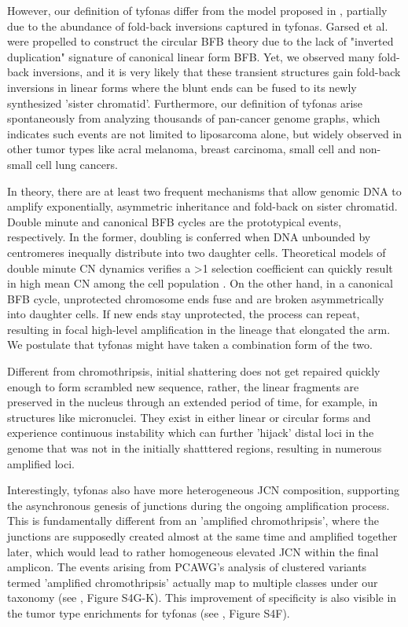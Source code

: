 \documentclass[phd,tocprelim]{cornell}
\begin{document}
However, our definition of tyfonas differ from the model proposed in \cite{garsed2014}, partially due to the abundance of fold-back inversions captured in tyfonas. Garsed et al. were propelled to construct the circular BFB theory due to the lack of "inverted duplication" signature of canonical linear form BFB. Yet, we observed many fold-back inversions, and it is very likely that these transient structures gain fold-back inversions in linear forms where the blunt ends can be fused to its newly synthesized 'sister chromatid'. Furthermore, our definition of tyfonas arise spontaneously from analyzing thousands of pan-cancer genome graphs, which indicates such events are not limited to liposarcoma alone, but widely observed in other tumor types like acral melanoma, breast carcinoma, small cell  and non-small cell lung cancers. 

In theory, there are at least two frequent mechanisms that allow genomic DNA to amplify exponentially, asymmetric inheritance and fold-back on sister chromatid. Double minute and canonical BFB cycles are the prototypical events, respectively. In the former, doubling is conferred when DNA unbounded by centromeres inequally distribute into two daughter cells. Theoretical models of double minute CN dynamics verifies a >1 selection coefficient can quickly result in high mean CN among the cell population \cite{Lange2021-if}. On the other hand, in a canonical BFB cycle, unprotected chromosome ends fuse and are broken asymmetrically into daughter cells. If new ends stay unprotected, the process can repeat, resulting in focal high-level amplification in the lineage that elongated the arm. We postulate that tyfonas might have taken a combination form of the two. 

Different from chromothripsis, initial shattering does not get repaired quickly enough to form scrambled new sequence, rather, the linear fragments are preserved in the nucleus through an extended period of time, for example, in structures like micronuclei. They exist in either linear or circular forms and experience continuous instability which can further 'hijack' distal loci in the genome that was not in the initially shatttered regions, resulting in numerous amplified loci.

Interestingly, tyfonas also have more heterogeneous JCN composition, supporting the asynchronous genesis of junctions during the ongoing amplification process. This is fundamentally different from an 'amplified chromothripsis', where the junctions are supposedly created almost at the same time and amplified together later, which would lead to rather homogeneous elevated JCN within the final amplicon. The events arising from PCAWG's analysis of clustered variants termed 'amplified chromothripsis' \cite{pcawg_marker2020-yi} actually map to multiple classes under our taxonomy (see \cite{Hadi2020-um}, Figure S4G-K). This improvement of specificity is also visible in the tumor type enrichments for tyfonas (see \cite{Hadi2020-um}, Figure S4F).
\end{document}
